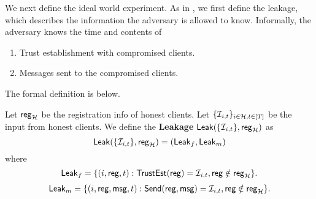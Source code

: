 We next define the ideal world experiment. As in \cite{shi2021non}, we first define the leakage, which describes the information the adversary is allowed to know. Informally, the adversary knows the time and contents of
\begin{enumerate}
    \item Trust establishment with compromised clients.
    \item Messages sent to the compromised clients.
\end{enumerate}
The formal definition is below.

\begin{definition}
\label{defn:messaging-leakage}
Let $\mathsf{reg}_{\mathcal{H}}$ be the registration info of honest clients. Let $\{\mathcal{I}_{i, t}\}_{i \in \mathcal{H}, t \in [T]}$ be the input from honest clients. We define the \textbf{Leakage} $\mathsf{Leak}(\{\mathcal{I}_{i, t}\}, \mathsf{reg}_{\mathcal{H}})$ as
$$\mathsf{Leak}(\{\mathcal{I}_{i, t}\}, \mathsf{reg}_{\mathcal{H}}) = (\mathsf{Leak}_f, \mathsf{Leak}_m)$$
where
$$\mathsf{Leak}_f = \{(i, \mathsf{reg}, t): \mathsf{TrustEst}(\mathsf{reg}) = \mathcal{I}_{i, t}, \mathsf{reg} \notin \mathsf{reg}_{\mathcal{H}}\}.$$
\begin{align*}
\mathsf{Leak}_m = \{(i, \mathsf{reg}, \mathsf{msg}, t): \mathsf{Send}(\mathsf{reg}, \mathsf{msg}) = \mathcal{I}_{i, t}, \mathsf{reg} \notin \mathsf{reg}_{\mathcal{H}}\}.    
\end{align*}
\end{definition}
